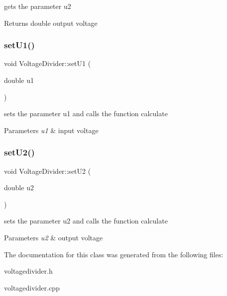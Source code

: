 gets the parameter u2 

\begin{DoxyReturn}{Returns}
double output voltage 
\end{DoxyReturn}
\mbox{\label{classVoltageDivider_aecff4be4ac8dbe9dbee07f57a15cc370}} 
\subsubsection{\texorpdfstring{set\+U1()}{setU1()}}
{\footnotesize\ttfamily void Voltage\+Divider\+::set\+U1 (\begin{DoxyParamCaption}\item[{double}]{u1 }\end{DoxyParamCaption})}



sets the parameter u1 and calls the function calculate 


\begin{DoxyParams}{Parameters}
{\em u1} & input voltage \\
\hline
\end{DoxyParams}
\mbox{\label{classVoltageDivider_a52270fd71980ed94bc64e7a6f65a9e5c}} 
\subsubsection{\texorpdfstring{set\+U2()}{setU2()}}
{\footnotesize\ttfamily void Voltage\+Divider\+::set\+U2 (\begin{DoxyParamCaption}\item[{double}]{u2 }\end{DoxyParamCaption})}



sets the parameter u2 and calls the function calculate 


\begin{DoxyParams}{Parameters}
{\em u2} & output voltage \\
\hline
\end{DoxyParams}


The documentation for this class was generated from the following files\+:\begin{DoxyCompactItemize}
\item 
voltagedivider.\+h\item 
voltagedivider.\+cpp\end{DoxyCompactItemize}
